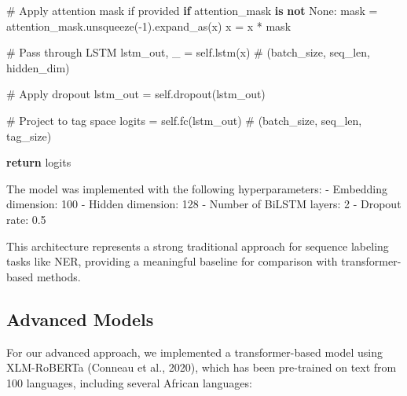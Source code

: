 \documentclass[
]{article}
\newenvironment{Shaded}{\begin{snugshade}}{\end{snugshade}}
\newcommand{\CommentTok}[1]{\textcolor[rgb]{0.37,0.37,0.37}{#1}}
\newcommand{\ControlFlowTok}[1]{\textcolor[rgb]{0.00,0.23,0.31}{\textbf{#1}}}
\newcommand{\DecValTok}[1]{\textcolor[rgb]{0.68,0.00,0.00}{#1}}
\newcommand{\KeywordTok}[1]{\textcolor[rgb]{0.00,0.23,0.31}{\textbf{#1}}}
\newcommand{\NormalTok}[1]{\textcolor[rgb]{0.00,0.23,0.31}{#1}}
\newcommand{\OperatorTok}[1]{\textcolor[rgb]{0.37,0.37,0.37}{#1}}
\newcommand{\VariableTok}[1]{\textcolor[rgb]{0.07,0.07,0.07}{#1}}
\begin{document}
\begin{Shaded}
\begin{Highlighting}[]
        \CommentTok{\# Apply attention mask if provided}
        \ControlFlowTok{if}\NormalTok{ attention\_mask }\KeywordTok{is} \KeywordTok{not} \VariableTok{None}\NormalTok{:}
\NormalTok{            mask }\OperatorTok{=}\NormalTok{ attention\_mask.unsqueeze(}\OperatorTok{{-}}\DecValTok{1}\NormalTok{).expand\_as(x)}
\NormalTok{            x }\OperatorTok{=}\NormalTok{ x }\OperatorTok{*}\NormalTok{ mask}
        
        \CommentTok{\# Pass through LSTM}
\NormalTok{        lstm\_out, \_ }\OperatorTok{=} \VariableTok{self}\NormalTok{.lstm(x)  }\CommentTok{\# (batch\_size, seq\_len, hidden\_dim)}
        
        \CommentTok{\# Apply dropout}
\NormalTok{        lstm\_out }\OperatorTok{=} \VariableTok{self}\NormalTok{.dropout(lstm\_out)}
        
        \CommentTok{\# Project to tag space}
\NormalTok{        logits }\OperatorTok{=} \VariableTok{self}\NormalTok{.fc(lstm\_out)  }\CommentTok{\# (batch\_size, seq\_len, tag\_size)}
        
        \ControlFlowTok{return}\NormalTok{ logits}
\end{Highlighting}
\end{Shaded}

The model was implemented with the following hyperparameters: -
Embedding dimension: 100 - Hidden dimension: 128 - Number of BiLSTM
layers: 2 - Dropout rate: 0.5

This architecture represents a strong traditional approach for sequence
labeling tasks like NER, providing a meaningful baseline for comparison
with transformer-based methods.

\subsection{Advanced Models}\label{advanced-models}

For our advanced approach, we implemented a transformer-based model
using XLM-RoBERTa (Conneau et al., 2020), which has been pre-trained on
text from 100 languages, including several African languages:
\end{document}
